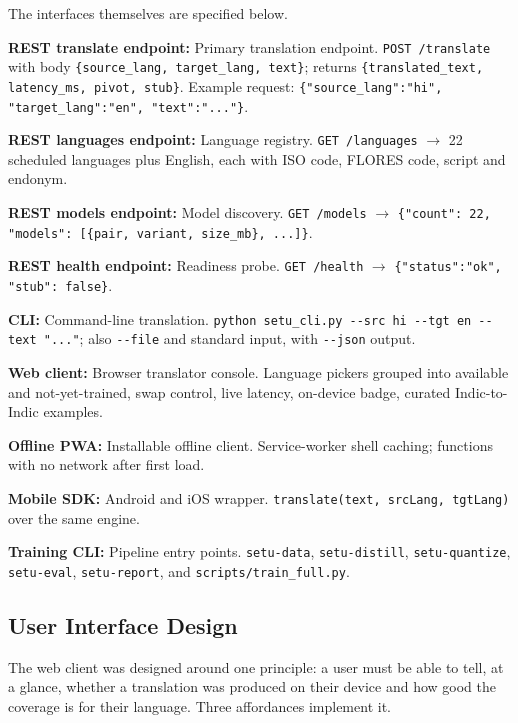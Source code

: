 The interfaces themselves are specified below.

\begin{bullets}
\item \textbf{REST translate endpoint:} Primary translation endpoint. \texttt{POST /translate} with body \texttt{\{source\_lang, target\_lang, text\}}; returns \texttt{\{translated\_text, latency\_ms, pivot, stub\}}. Example request: \texttt{\{"source\_lang":"hi", "target\_lang":"en", "text":"..."\}}.
\item \textbf{REST languages endpoint:} Language registry. \texttt{GET /languages} $\rightarrow$ 22 scheduled languages plus English, each with ISO code, FLORES code, script and endonym.
\item \textbf{REST models endpoint:} Model discovery. \texttt{GET /models} $\rightarrow$ \texttt{\{"count": 22, "models": [\{pair, variant, size\_mb\}, ...]\}}.
\item \textbf{REST health endpoint:} Readiness probe. \texttt{GET /health} $\rightarrow$ \texttt{\{"status":"ok", "stub": false\}}.
\item \textbf{CLI:} Command-line translation. \texttt{python setu\_cli.py -{}-src hi -{}-tgt en -{}-text "..."}; also \texttt{-{}-file} and standard input, with \texttt{-{}-json} output.
\item \textbf{Web client:} Browser translator console. Language pickers grouped into available and not-yet-trained, swap control, live latency, on-device badge, curated Indic-to-Indic examples.
\item \textbf{Offline PWA:} Installable offline client. Service-worker shell caching; functions with no network after first load.
\item \textbf{Mobile SDK:} Android and iOS wrapper. \texttt{translate(text, srcLang, tgtLang)} over the same engine.
\item \textbf{Training CLI:} Pipeline entry points. \texttt{setu-data}, \texttt{setu-distill}, \texttt{setu-quantize}, \texttt{setu-eval}, \texttt{setu-report}, and \texttt{scripts/train\_full.py}.
\end{bullets}

\subsection{User Interface Design}
\label{subsec:uidesign}

The web client was designed around one principle: a user must be able to tell,
at a glance, whether a translation was produced on their device and how good the
coverage is for their language. Three affordances implement it.

